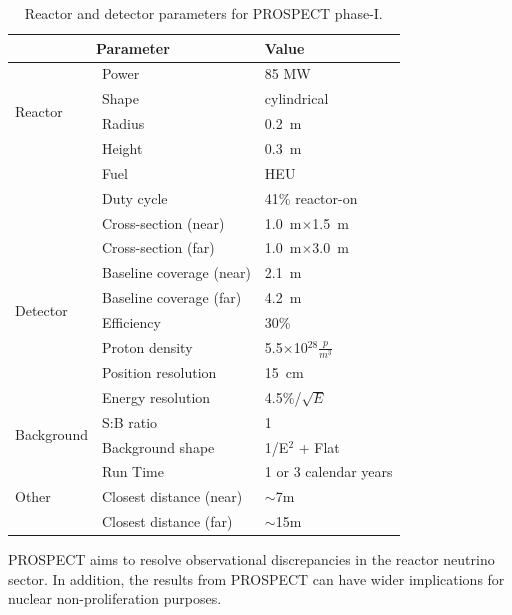 \documentclass[11pt]{article}
\numberwithin{equation}{section}
\begin{document}
\begin{table}[h]
\centering
    \begin{tabular}{|l | l | l |} \hline
      \multicolumn{2}{|c|}{Parameter} & Value\\ \hline
      \multirow{4}{*}{Reactor} & Power & 85 MW \\
      & Shape & cylindrical  \\
      & Radius & 0.2~m \\
      & Height & 0.3~m \\
      & Fuel & HEU \\
      & Duty cycle & 41\% reactor-on \\ \hline
      \multirow{8}{*}{Detector} & Cross-section (near) & 1.0~m$\times$1.5~m \\
      & Cross-section (far) & 1.0~m$\times$3.0~m \\
      & Baseline coverage (near) & 2.1~m \\
      & Baseline coverage (far) & 4.2~m \\
      & Efficiency & 30\%  \\  
      & Proton density & 5.5$\times$10$^{28}\frac{p}{m^3}$ \\
      & Position resolution & 15~cm   \\
      & Energy resolution & 4.5\%/$\sqrt{E}$ \\ \hline
      \multirow{2}{*}{Background}& S:B ratio & 1 \\
      & Background shape & 1/E$^2$ + Flat \\ \hline
      \multirow{3}{*}{Other} & Run Time & 1 or 3 calendar years  \\
      & Closest distance (near) & $\sim$7m \\ 
      & Closest distance (far) & $\sim$15m \\ \hline
    \end{tabular}
  \caption[Reactor and detector parameters for PROSPECT]{Reactor and detector parameters for PROSPECT phase-I.  }
  \label{tab:parameters}
\end{table}


PROSPECT aims to resolve observational discrepancies in the reactor neutrino sector. In addition, the results from PROSPECT can have wider implications for nuclear non-proliferation purposes. 
 
\end{document}
